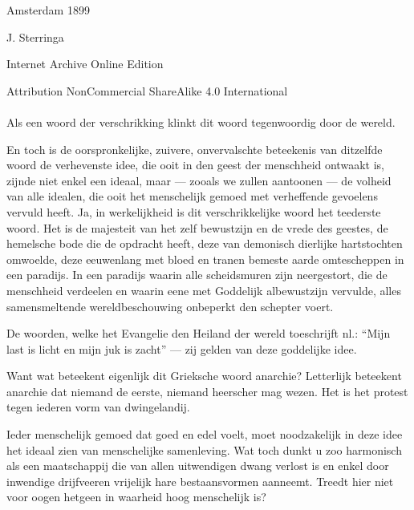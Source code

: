 \documentclass[a4paper, 12pt, oneside, dutch]{article}
\begin{document}
\begin{titlepage}
	
		
	\vspace*{\fill}%
	
	Amsterdam 1899 %
	
	{\small J. Sterringa } %

	\vspace{1\baselineskip} %

        Internet Archive Online Edition  %
	
	{\small Attribution NonCommercial ShareAlike 4.0 International } %
\end{titlepage}
\setlength{\parskip}{1mm plus1mm minus1mm}
\clearpage
\paragraph{}
Als een woord der verschrikking klinkt dit woord tegenwoordig door de wereld.

En toch is de oorspronkelijke, zuivere, onvervalschte beteekenis van ditzelfde woord de verhevenste idee, die ooit in den geest der menschheid ontwaakt is, zijnde niet enkel een ideaal, maar --- zooals we zullen aantoonen --- de volheid van alle idealen, die ooit het menschelijk gemoed met verheffende gevoelens vervuld heeft. Ja, in werkelijkheid is dit verschrikkelijke woord het teederste woord. Het is de majesteit van het zelf bewustzijn en de vrede des geestes, de hemelsche bode die de opdracht heeft, deze van demonisch dierlijke hartstochten omwoelde, deze eeuwenlang met bloed en tranen bemeste aarde omtescheppen in een paradijs. In een paradijs waarin alle scheidsmuren zijn neergestort, die de menschheid verdeelen en waarin eene met Goddelijk albewustzijn vervulde, alles samensmeltende wereldbeschouwing onbeperkt den schepter voert.

De woorden, welke het Evangelie den Heiland der wereld toeschrijft nl.: "`Mijn last is licht en mijn juk is zacht"' --- zij gelden van deze goddelijke idee.

Want wat beteekent eigenlijk dit Grieksche woord anarchie? Letterlijk beteekent anarchie dat niemand de eerste, niemand heerscher mag wezen.
Het is het protest tegen iederen vorm van dwingelandij.

Ieder menschelijk gemoed dat goed en edel voelt, moet noodzakelijk in deze idee het ideaal zien van menschelijke samenleving. Wat toch dunkt u zoo harmonisch als een maatschappij die van allen uitwendigen dwang verlost is en enkel door inwendige drijfveeren vrijelijk hare bestaansvormen aanneemt. Treedt hier niet voor oogen hetgeen in waarheid hoog menschelijk is?
\end{document}
